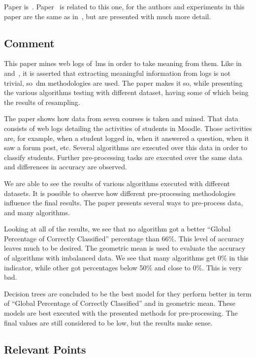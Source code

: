 Paper is~\cite{ind_003}. Paper~\cite{ind_007} is related to this one, for the
authors and experiments in this paper are the same as in~\cite{ind_007}, but
are presented with much more detail.

\subsection{Comment}

This paper mines web logs of~\gls{lms} in order to take meaning from them. Like
in~\cite{ind_007} and~\cite{ind_008}, it is asserted that extracting meaningful
information from logs is not trivial, so~\gls{dm} methodologies are used. The
paper makes it so, while presenting the various algorithms testing with
different dataset, having some of which being the results of resampling.

The paper shows how data from seven courses is taken and mined. That data
consists of web logs detailing the activities of students in Moodle. Those
activities are, for example, when a student logged in, when it answered a
question, when it saw a forum post, etc. Several algorithms are executed over
this data in order to classify students. Further pre-processing tasks are
executed over the same data and differences in accuracy are observed.

We are able to see the results of various algorithms executed with different
datasets. It is possible to observe how different pre-processing methodologies
influence the final results. The paper presents several ways to pre-process
data, and many algorithms.

Looking at all of the results, we see that no algorithm got a better ``Global
Percentage of Correctly Classified'' percentage than 66\%. This level of
accuracy leaves much to be desired. The geometric mean is used to evaluate the
accuracy of algorithms with imbalanced data. We see that many algorithms get
0\% in this indicator, while other got percentages below 50\% and close to 0\%.
This is very bad.

Decision trees are concluded to be the best model for they perform better in
term of ``Global Percentage of Correctly Classified'' and in geometric mean.
These models are best executed with the presented methods for pre-processing.
The final values are still considered to be low, but the results make sense.

\subsection{Relevant Points}

